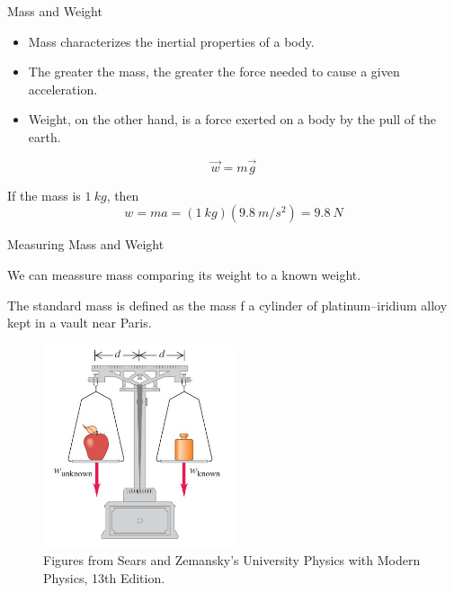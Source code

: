 \documentclass[]{beamer}
\begin{document}
\begin{frame}

 Mass and Weight
 \vspace{5mm}

\begin{itemize}
  \item  Mass characterizes the inertial properties of a body.
  \item The greater the mass, the greater the force needed to cause a given acceleration.
  \item Weight, on the other hand, is a force exerted on a body by the pull of the earth.
\end{itemize}
  

\begin{equation}
  \vec{w}=m\vec{g}
\end{equation}

If the mass is $1~kg$, then
\begin{equation}
  w=ma=(1~kg)(9.8~m/s^2)=9.8~N
\end{equation}
  
  \end{frame}



\begin{frame}
  Measuring Mass and Weight
  \vspace{5mm}

We can meassure mass comparing its weight to a known weight.


The standard mass is defined as the mass  f a cylinder of platinum–iridium alloy 
kept in a vault near Paris.




\begin{figure}[h!]  
  \includegraphics[width=0.5\textwidth]{images/f11.jpg}
  \caption{ {\tiny Figures from Sears and Zemansky's University Physics 
  with Modern Physics, 13th Edition.} }
\end{figure}




  \end{frame}
\end{document}
